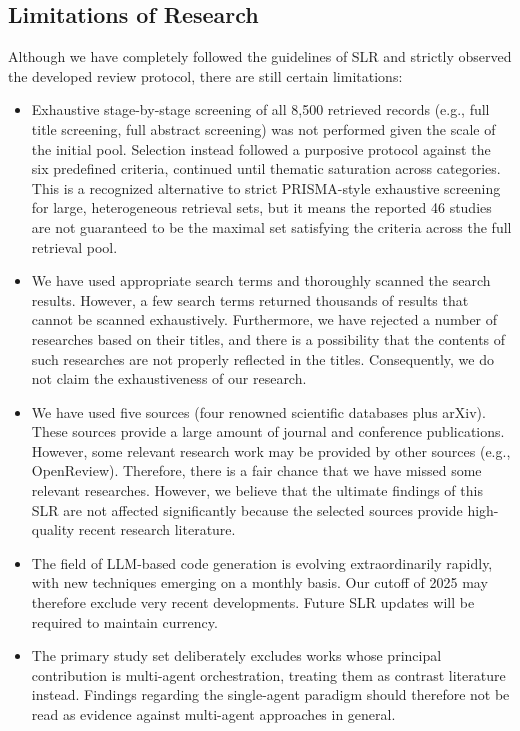 \documentclass[10pt,a4paper]{article}
\begin{document}
\subsection{Limitations of Research}
Although we have completely followed the guidelines of SLR and strictly observed the developed review protocol, there are still certain limitations:
\begin{itemize}[leftmargin=*]
\item Exhaustive stage-by-stage screening of all 8,500 retrieved records (e.g., full title screening, full abstract screening) was not performed given the scale of the initial pool. Selection instead followed a purposive protocol against the six predefined criteria, continued until thematic saturation across categories. This is a recognized alternative to strict PRISMA-style exhaustive screening for large, heterogeneous retrieval sets, but it means the reported 46 studies are not guaranteed to be the maximal set satisfying the criteria across the full retrieval pool.
\item We have used appropriate search terms and thoroughly scanned the search results. However, a few search terms returned thousands of results that cannot be scanned exhaustively. Furthermore, we have rejected a number of researches based on their titles, and there is a possibility that the contents of such researches are not properly reflected in the titles. Consequently, we do not claim the exhaustiveness of our research.
\item We have used five sources (four renowned scientific databases plus arXiv). These sources provide a large amount of journal and conference publications. However, some relevant research work may be provided by other sources (e.g., OpenReview). Therefore, there is a fair chance that we have missed some relevant researches. However, we believe that the ultimate findings of this SLR are not affected significantly because the selected sources provide high-quality recent research literature.
\item The field of LLM-based code generation is evolving extraordinarily rapidly, with new techniques emerging on a monthly basis. Our cutoff of 2025 may therefore exclude very recent developments. Future SLR updates will be required to maintain currency.
\item The primary study set deliberately excludes works whose principal contribution is multi-agent orchestration, treating them as contrast literature instead. Findings regarding the single-agent paradigm should therefore not be read as evidence against multi-agent approaches in general.
\end{itemize}
\end{document}
